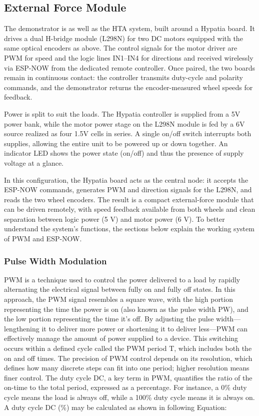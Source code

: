 \subsection{External Force Module}
The demonstrator is as well as the HTA system, built around a Hypatia board. It drives a dual H-bridge module (L298N) for two DC motors equipped with the same optical encoders as above. The control signals for the motor driver are PWM for speed and the logic lines IN1–IN4 for directions and received wirelessly via ESP-NOW from the dedicated remote controller. Once paired, the two boards remain in continuous contact: the controller transmits duty-cycle and polarity commands, and the demonstrator returns the encoder-measured wheel speeds for feedback.

Power is split to suit the loads. The Hypatia controller is supplied from a 5V power bank, while the motor power stage on the L298N module is fed by a 6V source realized as four 1.5V cells in series. A single on/off switch interrupts both supplies, allowing the entire unit to be powered up or down together. An indicator LED shows the power state (on/off) and thus the presence of supply voltage at a glance.

In this configuration, the Hypatia board acts as the central node: it accepts the ESP-NOW commands, generates PWM and direction signals for the L298N, and reads the two wheel encoders. The result is a compact external-force module that can be driven remotely, with speed feedback available from both wheels and clean separation between logic power (5 V) and motor power (6 V). To better understand the system’s functions, the sections below explain the working system of PWM and ESP-NOW.


\subsubsection{Pulse Width Modulation}
\ac{PWM} is a technique used to control the power delivered to a load by rapidly alternating the electrical signal between fully on and fully off states. In this approach, the PWM signal resembles a square wave, with the high portion representing the time the power is on (also known as the pulse width PW), and the low portion representing the time it’s off. By adjusting the pulse width—lengthening it to deliver more power or shortening it to deliver less—PWM can effectively manage the amount of power supplied to a device. This switching occurs within a defined cycle called the PWM period T, which includes both the on and off times. The precision of PWM control depends on its resolution, which defines how many discrete steps can fit into one period; higher resolution means finer control. The duty cycle DC, a key term in PWM, quantifies the ratio of the on-time to the total period, expressed as a percentage. For instance, a 0\% duty cycle means the load is always off, while a 100\% duty cycle means it is always on. A duty cycle DC (\%) may be calculated as shown in following Equation:

